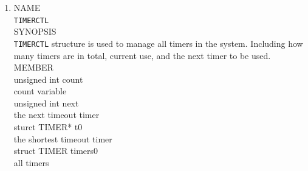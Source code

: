 \documentclass{swfcthesis}
\begin{document}
\begin{enumerate}
  \item
  NAME \\
  \hspace*{1cm}\texttt{TIMERCTL} \\
  SYNOPSIS \\
  \hspace*{1cm} \texttt{TIMERCTL} structure is used to manage all
timers in the system. Including how many timers are in total, current use, and the next
timer to be used.\\
  MEMBER \\
  \hspace*{1cm} unsigned int count\\
  \hspace*{1.5cm}  count variable\\
  \hspace*{1cm} unsigned int next\\
  \hspace*{1.5cm} the next timeout timer\\
  \hspace*{1cm} sturct TIMER* t0\\
  \hspace*{1.5cm} the shortest timeout timer\\
  \hspace*{1cm} struct TIMER timers0\\
  \hspace*{1.5cm} all timers\\


\end{enumerate}
\end{document}
